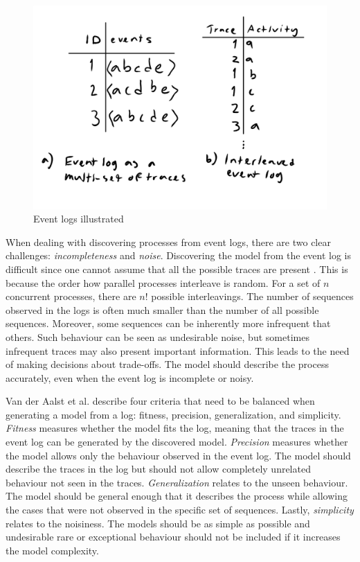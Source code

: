 \begin{figure}[htb]
\centering \includegraphics[width=0.7\linewidth]{gfx/figures/traceeventlog.png}
\caption{Event logs illustrated  }
\label{fig:tracevslog}
\end{figure}

When dealing with discovering processes from event logs, there are two clear challenges: \emph{incompleteness} and \emph{noise}. 
Discovering the model from the event log is difficult since one cannot assume that all the possible traces are present \cite{van2013discovering}. 
This is because the order how parallel processes interleave is random. 
For a set of $n$ concurrent processes, there are $n!$ possible interleavings.
The number of sequences observed in the logs \cite{van2007business} is often much smaller than the number of all possible sequences.
Moreover, some sequences can be inherently more infrequent that others. 
Such behaviour can be seen as undesirable noise, but sometimes infrequent traces may also present important information.
This leads to the need of making decisions about trade-offs. 
The model should describe the process accurately, even when the event log is incomplete or noisy.

Van der Aalst et al. \cite{van2013discovering} describe four criteria that need to be balanced when generating a model from a log: fitness, precision, generalization, and simplicity.
\emph{Fitness} measures whether the model fits the log, meaning that the traces in the event log can be generated by the discovered model.
\emph{Precision} measures whether the model allows only the behaviour observed in the event log. The model should describe the traces in the log but should not allow completely unrelated behaviour not seen in the traces.
\emph{Generalization} relates to the unseen behaviour. The model should be general enough that it describes the process while allowing the cases that were not observed in the specific set of sequences.
Lastly, \emph{simplicity} relates to the noisiness. The models should be as simple as possible and undesirable rare or exceptional behaviour should not be included if it increases the model complexity.


